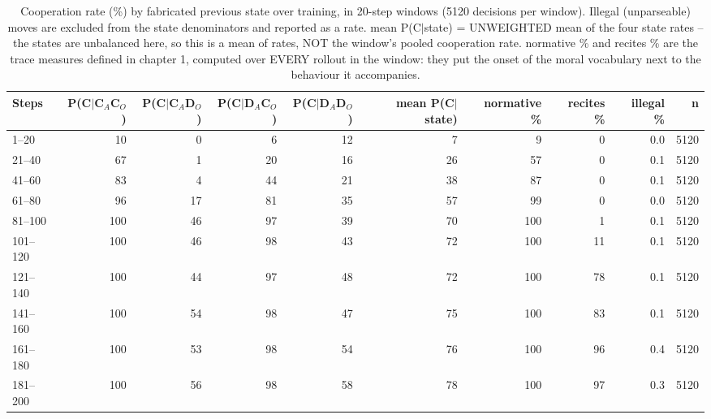\begin{table}[t]
\centering
\caption{Cooperation rate (\%) by fabricated previous state over training, in 20-step windows (5120 decisions per window). Illegal (unparseable) moves are excluded from the state denominators and reported as a rate. mean P(C$\mid$state) = UNWEIGHTED mean of the four state rates -- the states are unbalanced here, so this is a mean of rates, NOT the window's pooled cooperation rate. normative \% and recites \% are the trace measures defined in chapter 1, computed over EVERY rollout in the window: they put the onset of the moral vocabulary next to the behaviour it accompanies.}
\label{tab:trajectory-qwen_run2_200}
\small
\setlength{\tabcolsep}{3.5pt}
\begin{tabular}{lrrrrrrrrr}
\toprule
Steps & P(C$\mid$C$_A$C$_O$) & P(C$\mid$C$_A$D$_O$) & P(C$\mid$D$_A$C$_O$) & P(C$\mid$D$_A$D$_O$) & mean P(C$\mid$state) & normative \% & recites \% & illegal \% & n \\
\midrule
1–20 & 10 & 0 & 6 & 12 & 7 & 9 & 0 & 0.0 & 5120 \\
21–40 & 67 & 1 & 20 & 16 & 26 & 57 & 0 & 0.1 & 5120 \\
41–60 & 83 & 4 & 44 & 21 & 38 & 87 & 0 & 0.1 & 5120 \\
61–80 & 96 & 17 & 81 & 35 & 57 & 99 & 0 & 0.0 & 5120 \\
81–100 & 100 & 46 & 97 & 39 & 70 & 100 & 1 & 0.1 & 5120 \\
101–120 & 100 & 46 & 98 & 43 & 72 & 100 & 11 & 0.1 & 5120 \\
121–140 & 100 & 44 & 97 & 48 & 72 & 100 & 78 & 0.1 & 5120 \\
141–160 & 100 & 54 & 98 & 47 & 75 & 100 & 83 & 0.1 & 5120 \\
161–180 & 100 & 53 & 98 & 54 & 76 & 100 & 96 & 0.4 & 5120 \\
181–200 & 100 & 56 & 98 & 58 & 78 & 100 & 97 & 0.3 & 5120 \\
\bottomrule
\end{tabular}
\end{table}
